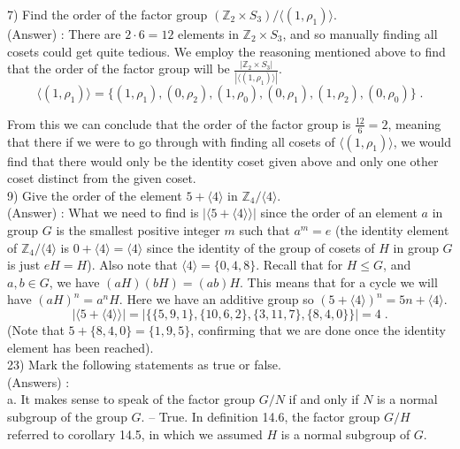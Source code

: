 \documentclass[12pt, letterpaper]{article}
\begin{document}
7) Find the order of the factor group $(\mathbb{Z}_2 \times S_3) / \langle (1,\rho_1) \rangle$. \\

(Answer) : There are $2 \cdot 6 = 12$ elements in $\mathbb{Z}_2 \times S_3$, and so manually finding all cosets could get quite tedious. We employ the reasoning mentioned above to find that the order of the factor group will be $\frac{|\mathbb{Z}_2 \times S_3 |}{|\langle (1,\rho_1) \rangle|}$. 
$$ \langle (1,\rho_1) \rangle = \{(1,\rho_1), (0,\rho_2), (1,\rho_0), (0,\rho_1), (1,\rho_2), (0,\rho_0)\}\;.$$

From this we can conclude that the order of the factor group is $\frac{12}{6} = 2$, meaning that there if we were to go through with finding all cosets of $\langle (1,\rho_1) \rangle$, we would find that there would only be the identity coset given above and only one other coset distinct from the given coset. \\

9) Give the order of the element $5 + \langle 4 \rangle$ in $\mathbb{Z}_4 / \langle 4 \rangle$. \\

(Answer) : What we need to find is $|\langle 5 + \langle 4\rangle \rangle |$ since the order of an element $a$ in group $G$ is the smallest positive integer $m$ such that $a^m = e$ (the identity element of $\mathbb{Z}_4 / \langle 4 \rangle$ is $0 + \langle 4 \rangle = \langle 4 \rangle$ since the identity of the group of cosets of $H$ in group $G$ is just $eH = H$). Also note that $\langle 4 \rangle = \{0,4,8\}$. Recall that for $H \leq G$, and $a,b \in G$, we have $(aH)(bH) = (ab)H$. This means that for a cycle we will have $(aH)^n = a^nH$. Here we have an additive group so $(5 + \langle 4 \rangle)^n = 5n + \langle 4 \rangle$. $$|\langle 5 + \langle 4 \rangle \rangle | = |\{\{5,9,1\}, \{10,6,2\}, \{3,11,7\}, \{8,4,0\}\} | = 4\;.$$ (Note that $5+ \{8,4,0\} = \{1,9,5\}$, confirming that we are done once the identity element has been reached). \\

23) Mark the following statements as true or false. \\

(Answers) : \\

a. It makes sense to speak of the factor group $G / N$ if and only if $N$ is a normal subgroup of the group $G$. -- True. In definition 14.6, the factor group $G/H$ referred to corollary 14.5, in which we assumed $H$ is a normal subgroup of $G$. \\
\end{document}

